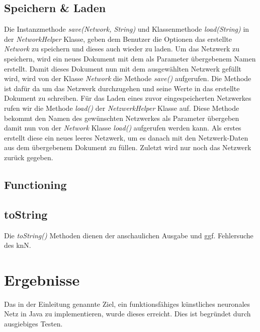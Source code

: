 \documentclass[paper=A4,pagesize=auto,12pt,headinclude=true,footinclude=true,BCOR=0mm,DIV=calc]{scrartcl}
\begin{document}
\subsection{Speichern \& Laden}
Die Instanzmethode \textit{save(Network, String)} und Klassenmethode \textit{load(String)} in der \textit{NetworkHelper} Klasse, geben dem Benutzer die Optionen das erstellte \textit{Network} zu speichern und dieses auch wieder zu laden.
Um das Netzwerk zu speichern, wird ein neues Dokument mit dem als Parameter übergebenem Namen erstellt. Damit dieses Dokument nun mit dem ausgewählten Netzwerk gefüllt wird, wird von der Klasse \textit{Network} die Methode \textit{save()} aufgerufen. Die Methode ist dafür da um das Netzwerk durchzugehen und seine Werte in das
erstellte Dokument zu schreiben. Für das Laden eines zuvor eingespeicherten Netzwerkes rufen wir die Methode \textit{load()} der \textit{NetzwerkHelper} Klasse auf. Diese Methode bekommt den Namen des gewünschten Netzwerkes als Parameter übergeben damit nun von der \textit{Network} Klasse \textit{load()} aufgerufen werden kann. Als erstes erstellt diese ein neues leeres Netzwerk, um es danach mit den Netzwerk-Daten aus dem übergebenem Dokument zu füllen. Zuletzt wird nur noch das Netzwerk zurück gegeben.


\subsection{Functioning}


\subsection{toString}
Die \textit{toString()} Methoden dienen der anschaulichen Ausgabe und ggf. Fehlersuche des knN. 

\newpage

\section{Ergebnisse}
Das in der Einleitung genannte Ziel, ein funktionsfähiges künstliches neuronales Netz in Java zu implementieren, wurde dieses erreicht. Dies ist begründet durch ausgiebiges Testen.
\end{document}
